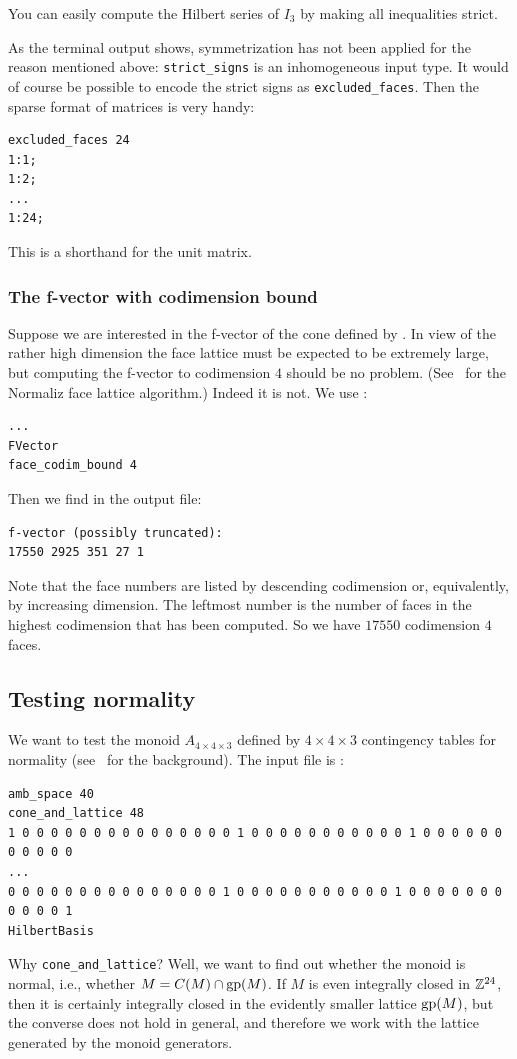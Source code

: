 You can easily compute the Hilbert series of $I_3$ by making all inequalities strict.

As the terminal output shows, symmetrization has not been applied for the reason mentioned above: \verb|strict_signs| is an inhomogeneous input type. It would of course be possible to encode the strict signs as \verb|excluded_faces|. Then the sparse format of matrices is very handy:
\begin{Verbatim}
excluded_faces 24
1:1;
1:2;
...
1:24;
\end{Verbatim}
This is a shorthand for the unit matrix.

\subsubsection{The f-vector with codimension bound}\label{codim_bound}

Suppose we are interested in the f-vector of the cone defined by . In view of the rather high dimension the face lattice must be expected to be extremely large, but computing the f-vector to codimension $4$ should be no problem. (See~\cite{BGOW} for the Normaliz face lattice algorithm.) Indeed it is not. We use :
\begin{Verbatim}
...
FVector
face_codim_bound 4
\end{Verbatim}

Then we find in the output file:
\begin{Verbatim}
f-vector (possibly truncated):
17550 2925 351 27 1
\end{Verbatim}
Note that the face numbers are listed by descending codimension or, equivalently, by increasing dimension. The leftmost number is the number of faces in the highest codimension that has been computed. So we have $17550$ codimension $4$ faces.


\subsection{Testing normality}\label{normalization_ex}

We want to test the monoid $A_{4\times 4\times 3}$ defined by $4\times4\times3$ contingency tables for normality (see~\cite{BHIKS} for the background). The input file is :
\begin{Verbatim}
amb_space 40
cone_and_lattice 48
1 0 0 0 0 0 0 0 0 0 0 0 0 0 0 0 1 0 0 0 0 0 0 0 0 0 0 0 1 0 0 0 0 0 0 0 0 0 0 0
...
0 0 0 0 0 0 0 0 0 0 0 0 0 0 0 1 0 0 0 0 0 0 0 0 0 0 0 1 0 0 0 0 0 0 0 0 0 0 0 1
HilbertBasis
\end{Verbatim}
Why \verb|cone_and_lattice|? Well, we want to find out whether the monoid is normal, i.e., whether $M=C(M)\cap\operatorname{gp}(M)$. If $M$ is even integrally closed in ${\mathbb Z}^{24}$, then it is certainly integrally closed in the evidently smaller lattice $\operatorname{gp}(M)$, but the converse does not hold in general, and therefore we work with the lattice generated by the monoid generators.

